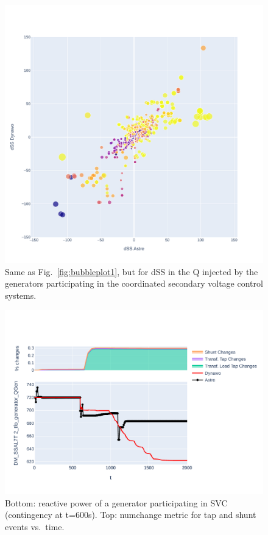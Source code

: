 \documentclass[conference]{IEEEtran}
\begin{document}
\begin{figure}
  \centering
  \includegraphics[width=\columnwidth]{figs/Qgen_dSS_GENS_20210211-0930_moreT600}
  \caption{Same as Fig.~\ref{fig:bubbleplot1}, but for dSS in the Q
    injected by the generators participating in the coordinated
    secondary voltage control systems.}
  \label{fig:bubbleplot2}
\end{figure}

\begin{figure}
  \centering
  \includegraphics[width=\columnwidth]{figs/Qgen_curve_GENS_20210211-0930_moreT600}
  \caption{Bottom: reactive power of a generator participating in SVC
    (contingency at t=600s). Top: numchange metric for tap and shunt events
    vs.\ time.}
  \label{fig:curveplot}
\end{figure}
\end{document}
